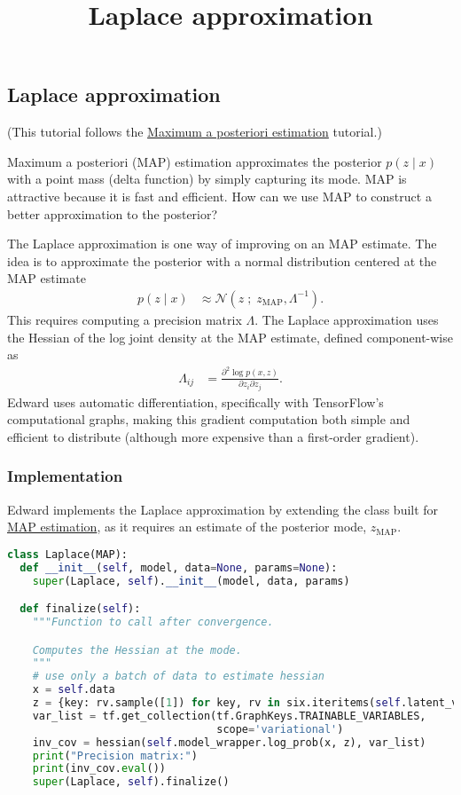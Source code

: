 \title{Laplace approximation}

\subsection{Laplace approximation}

(This tutorial follows the
\href{tut_MAP}{Maximum a posteriori estimation} tutorial.)

Maximum a posteriori (MAP) estimation approximates the posterior $p(z \mid x)$
with a point mass (delta function) by simply capturing its mode. MAP is
attractive because it is fast and efficient. How can we use MAP to construct a
better approximation to the posterior?

The Laplace approximation is one way of improving on an MAP estimate. The idea
is to approximate the posterior with a normal distribution centered at the MAP
estimate
\begin{align*}
  p(z \mid x)
  &\approx
  \mathcal{N}(z\;;\; z_\text{MAP}, \Lambda^{-1}).
\end{align*}
This requires computing a precision matrix $\Lambda$. The Laplace approximation
uses the Hessian of the log joint density at the MAP estimate,
defined component-wise as
\begin{align*}
  \Lambda_{ij}
  &=
  \frac{\partial^2 \log p(x, z)}{\partial z_i \partial z_j}.
\end{align*}
Edward uses automatic differentiation, specifically with TensorFlow's
computational graphs, making this gradient computation both simple and
efficient to distribute (although more expensive than a first-order
gradient).

\subsubsection{Implementation}

Edward implements the Laplace approximation by extending the class built for
\href{tut_MAP}{MAP estimation}, as it requires an estimate of the
posterior mode, $z_\text{MAP}$.

\begin{lstlisting}[language=Python]
class Laplace(MAP):
  def __init__(self, model, data=None, params=None):
    super(Laplace, self).__init__(model, data, params)

  def finalize(self):
    """Function to call after convergence.

    Computes the Hessian at the mode.
    """
    # use only a batch of data to estimate hessian
    x = self.data
    z = {key: rv.sample([1]) for key, rv in six.iteritems(self.latent_vars)}
    var_list = tf.get_collection(tf.GraphKeys.TRAINABLE_VARIABLES,
                                 scope='variational')
    inv_cov = hessian(self.model_wrapper.log_prob(x, z), var_list)
    print("Precision matrix:")
    print(inv_cov.eval())
    super(Laplace, self).finalize()
\end{lstlisting}

